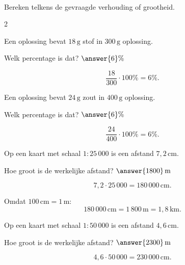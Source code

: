 \documentclass{ximera}
\begin{document}
    
    
    \begin{oefening}[Verhoudingen]{\oefB}
    \\
    
    Bereken telkens de gevraagde verhouding of grootheid.
    
    \begin{multicols}{2}
    
    \begin{question}
    Een oplossing bevat $18\,\mathrm g$ stof in $300\,\mathrm g$ oplossing.
    
    Welk percentage is dat? $\answer{6}\%$
    
    \begin{oplossing}
    \[
    \dfrac{18}{300}\cdot100\%=6\%.
    \]
    \end{oplossing}
    \end{question}
    
    
    \begin{question}
    Een oplossing bevat $24\,\mathrm g$ zout in $400\,\mathrm g$ oplossing.
    
    Welk percentage is dat? $\answer{6}\%$
    
    \begin{oplossing}
    \[
    \dfrac{24}{400}\cdot100\%=6\%.
    \]
    \end{oplossing}
    \end{question}
    
    
    \begin{question}
    Op een kaart met schaal $1:25\,000$ is een afstand $7{,}2\,\mathrm{cm}$.
    
    Hoe groot is de werkelijke afstand? $\answer{1800}\,\mathrm m$
    
    \begin{oplossing}
    \[
    7{,}2\cdot25\,000
    =180\,000\,\mathrm{cm}.
    \]
    
    Omdat $100\,\mathrm{cm}=1\,\mathrm m$:
    \[
    180\,000\,\mathrm{cm}
    =1\,800\,\mathrm m
    =1{,}8\,\mathrm{km}.
    \]
    \end{oplossing}
    \end{question}
    
    
    \begin{question}
    Op een kaart met schaal $1:50\,000$ is een afstand $4{,}6\,\mathrm{cm}$.
    
    Hoe groot is de werkelijke afstand? $\answer{2300}\,\mathrm m$
    
    \begin{oplossing}
    \[
    4{,}6\cdot50\,000
    =230\,000\,\mathrm{cm}.
    \]
    

\end{oplossing}
\end{question}
\end{multicols}
\end{oefening}
\end{document}
